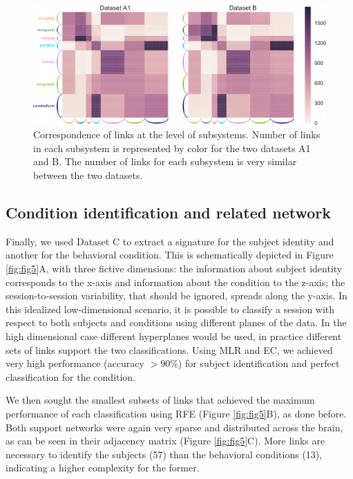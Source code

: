 \documentclass[12pt, a4paper, final, fleqn]{article}
\begin{document}
\begin{figure}[htpb]
	\centering
	\includegraphics[width=0.9\columnwidth]{avg_ranking_subsystems.png}
	\caption{Correspondence of links at the level of subsystems. Number of links in each subsystem is represented by color for the two
	datasets A1 and B. The number of links for each subsystem is very similar between the two datasets.}
	\label{fig:fig4}
\end{figure}

\subsection{Condition identification and related network}

Finally, we used Dataset C to extract a signature for the subject identity and
another for the behavioral condition. This is schematically depicted in Figure
\ref{fig:fig5}A, with three fictive dimensions: the information about subject identity
corresponds to the x-axis and information about the condition to the z-axis;
the session-to-session variability, that should be ignored, spreads along the
y-axis. In this idealized low-dimensional scenario, it is possible to classify a session with
respect to both subjects and conditions using different planes of the data.
In the high dimensional case different hyperplanes would be used, in practice different sets of links support
the two classifications.  Using MLR and EC, we achieved very high performance
(accuracy $>$90\%) for subject identification and perfect classification for the
condition. 

We then sought the smallest subsets of links that achieved the maximum
performance of each classification using RFE (Figure \ref{fig:fig5}B), as done before.
Both support networks were again very sparse and
distributed across the brain, as can be seen in their adjacency matrix (Figure
\ref{fig:fig5}C). More links are necessary to identify the subjects (57) than the behavioral
conditions (13), indicating a higher complexity for the former.
\end{document}

